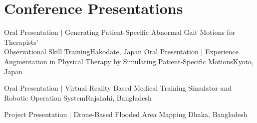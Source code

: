\section{Conference Presentations}
\cvSubHeadingListStart
{}
{Oral Presentation $|$ Generating Patient-Specific Abnormal Gait Motions for Therapists’\\ Observational Skill Training}{Hakodate, Japan}
\vspace{5pt}
{Oral Presentation $|$ Experience Augmentation in Physical Therapy by Simulating Patient-Specific Motions}{Kyoto, Japan}
\vspace{5pt}

{Oral Presentation $|$ Virtual Reality Based Medical Training Simulator and Robotic Operation System}{Rajshahi, Bangladesh}
\vspace{5pt}



{Project Presentation $|$ Drone-Based Flooded Area Mapping
}{Dhaka, Bangladesh}
\vspace{5pt}



\cvSubHeadingListEnd
